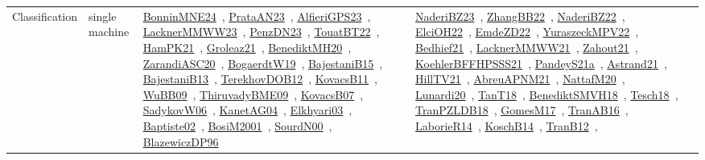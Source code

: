{\begin{longtable}{lp{3cm}>{\raggedright\arraybackslash}p{6cm}>{\raggedright\arraybackslash}p{6cm}>{\raggedright\arraybackslash}p{8cm}}
\index{single machine}\index{Classification!single machine}Classification & single machine & \href{../works/BonninMNE24.pdf}{BonninMNE24}~\cite{BonninMNE24}, \href{../works/PrataAN23.pdf}{PrataAN23}~\cite{PrataAN23}, \href{../works/AlfieriGPS23.pdf}{AlfieriGPS23}~\cite{AlfieriGPS23}, \href{../works/LacknerMMWW23.pdf}{LacknerMMWW23}~\cite{LacknerMMWW23}, \href{../works/PenzDN23.pdf}{PenzDN23}~\cite{PenzDN23}, \href{../works/TouatBT22.pdf}{TouatBT22}~\cite{TouatBT22}, \href{../works/HamPK21.pdf}{HamPK21}~\cite{HamPK21}, \href{../works/Groleaz21.pdf}{Groleaz21}~\cite{Groleaz21}, \href{../works/BenediktMH20.pdf}{BenediktMH20}~\cite{BenediktMH20}, \href{../works/ZarandiASC20.pdf}{ZarandiASC20}~\cite{ZarandiASC20}, \href{../works/BogaerdtW19.pdf}{BogaerdtW19}~\cite{BogaerdtW19}, \href{../works/BajestaniB15.pdf}{BajestaniB15}~\cite{BajestaniB15}, \href{../works/BajestaniB13.pdf}{BajestaniB13}~\cite{BajestaniB13}, \href{../works/TerekhovDOB12.pdf}{TerekhovDOB12}~\cite{TerekhovDOB12}, \href{../works/KovacsB11.pdf}{KovacsB11}~\cite{KovacsB11}, \href{../works/WuBB09.pdf}{WuBB09}~\cite{WuBB09}, \href{../works/ThiruvadyBME09.pdf}{ThiruvadyBME09}~\cite{ThiruvadyBME09}, \href{../works/KovacsB07.pdf}{KovacsB07}~\cite{KovacsB07}, \href{../works/SadykovW06.pdf}{SadykovW06}~\cite{SadykovW06}, \href{../works/KanetAG04.pdf}{KanetAG04}~\cite{KanetAG04}, \href{../works/Elkhyari03.pdf}{Elkhyari03}~\cite{Elkhyari03}, \href{../works/Baptiste02.pdf}{Baptiste02}~\cite{Baptiste02}, \href{../works/BosiM2001.pdf}{BosiM2001}~\cite{BosiM2001}, \href{../works/SourdN00.pdf}{SourdN00}~\cite{SourdN00}, \href{../works/BlazewiczDP96.pdf}{BlazewiczDP96}~\cite{BlazewiczDP96} & \href{../works/NaderiBZ23.pdf}{NaderiBZ23}~\cite{NaderiBZ23}, \href{../works/ZhangBB22.pdf}{ZhangBB22}~\cite{ZhangBB22}, \href{../works/NaderiBZ22.pdf}{NaderiBZ22}~\cite{NaderiBZ22}, \href{../works/ElciOH22.pdf}{ElciOH22}~\cite{ElciOH22}, \href{../works/EmdeZD22.pdf}{EmdeZD22}~\cite{EmdeZD22}, \href{../works/YuraszeckMPV22.pdf}{YuraszeckMPV22}~\cite{YuraszeckMPV22}, \href{../works/Bedhief21.pdf}{Bedhief21}~\cite{Bedhief21}, \href{../works/LacknerMMWW21.pdf}{LacknerMMWW21}~\cite{LacknerMMWW21}, \href{../works/Zahout21.pdf}{Zahout21}~\cite{Zahout21}, \href{../works/KoehlerBFFHPSSS21.pdf}{KoehlerBFFHPSSS21}~\cite{KoehlerBFFHPSSS21}, \href{../works/PandeyS21a.pdf}{PandeyS21a}~\cite{PandeyS21a}, \href{../works/Astrand21.pdf}{Astrand21}~\cite{Astrand21}, \href{../works/HillTV21.pdf}{HillTV21}~\cite{HillTV21}, \href{../works/AbreuAPNM21.pdf}{AbreuAPNM21}~\cite{AbreuAPNM21}, \href{../works/NattafM20.pdf}{NattafM20}~\cite{NattafM20}, \href{../works/Lunardi20.pdf}{Lunardi20}~\cite{Lunardi20}, \href{../works/TanT18.pdf}{TanT18}~\cite{TanT18}, \href{../works/BenediktSMVH18.pdf}{BenediktSMVH18}~\cite{BenediktSMVH18}, \href{../works/Tesch18.pdf}{Tesch18}~\cite{Tesch18}, \href{../works/TranPZLDB18.pdf}{TranPZLDB18}~\cite{TranPZLDB18}, \href{../works/GomesM17.pdf}{GomesM17}~\cite{GomesM17}, \href{../works/TranAB16.pdf}{TranAB16}~\cite{TranAB16}, \href{../works/LaborieR14.pdf}{LaborieR14}~\cite{LaborieR14}, \href{../works/KoschB14.pdf}{KoschB14}~\cite{KoschB14}, \href{../works/TranB12.pdf}{TranB12}~\cite{TranB12}, 
\end{longtable}}
